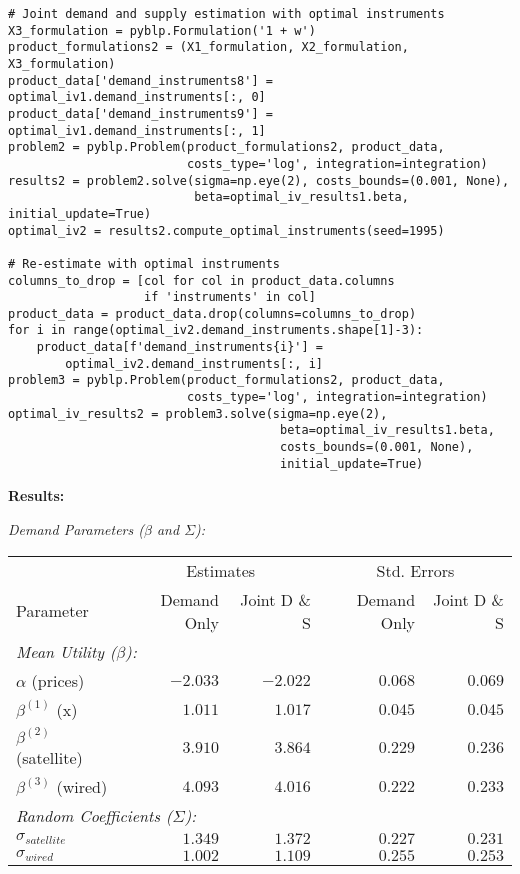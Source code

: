 \documentclass[english,11pt]{article}
\begin{document}
\begin{enumerate}
\begin{enumerate}
\begin{verbatim}
# Joint demand and supply estimation with optimal instruments
X3_formulation = pyblp.Formulation('1 + w')
product_formulations2 = (X1_formulation, X2_formulation, X3_formulation)
product_data['demand_instruments8'] = optimal_iv1.demand_instruments[:, 0]
product_data['demand_instruments9'] = optimal_iv1.demand_instruments[:, 1]
problem2 = pyblp.Problem(product_formulations2, product_data, 
                         costs_type='log', integration=integration)
results2 = problem2.solve(sigma=np.eye(2), costs_bounds=(0.001, None), 
                          beta=optimal_iv_results1.beta, initial_update=True)
optimal_iv2 = results2.compute_optimal_instruments(seed=1995)

# Re-estimate with optimal instruments
columns_to_drop = [col for col in product_data.columns 
                   if 'instruments' in col]
product_data = product_data.drop(columns=columns_to_drop)
for i in range(optimal_iv2.demand_instruments.shape[1]-3):
    product_data[f'demand_instruments{i}'] = 
        optimal_iv2.demand_instruments[:, i]
problem3 = pyblp.Problem(product_formulations2, product_data, 
                         costs_type='log', integration=integration)
optimal_iv_results2 = problem3.solve(sigma=np.eye(2), 
                                      beta=optimal_iv_results1.beta, 
                                      costs_bounds=(0.001, None), 
                                      initial_update=True)
\end{verbatim}

\textbf{Results:}

\textit{Demand Parameters ($\beta$ and $\Sigma$):}

\begin{center}
\begin{tabular}{lrrrr}
\hline
 & \multicolumn{2}{c}{Estimates} & \multicolumn{2}{c}{Std. Errors} \\
Parameter & Demand Only & Joint D \& S & Demand Only & Joint D \& S \\
\hline
\multicolumn{5}{l}{\textit{Mean Utility ($\beta$):}} \\
$\alpha$ (prices) & $-2.033$ & $-2.022$ & $0.068$ & $0.069$ \\
$\beta^{(1)}$ (x) & $1.011$ & $1.017$ & $0.045$ & $0.045$ \\
$\beta^{(2)}$ (satellite) & $3.910$ & $3.864$ & $0.229$ & $0.236$ \\
$\beta^{(3)}$ (wired) & $4.093$ & $4.016$ & $0.222$ & $0.233$ \\
\hline
\multicolumn{5}{l}{\textit{Random Coefficients ($\Sigma$):}} \\
$\sigma_{satellite}$ & $1.349$ & $1.372$ & $0.227$ & $0.231$ \\
$\sigma_{wired}$ & $1.002$ & $1.109$ & $0.255$ & $0.253$ \\
\hline
\end{tabular}
\end{center}


\end{enumerate}
\end{enumerate}
\end{document}
